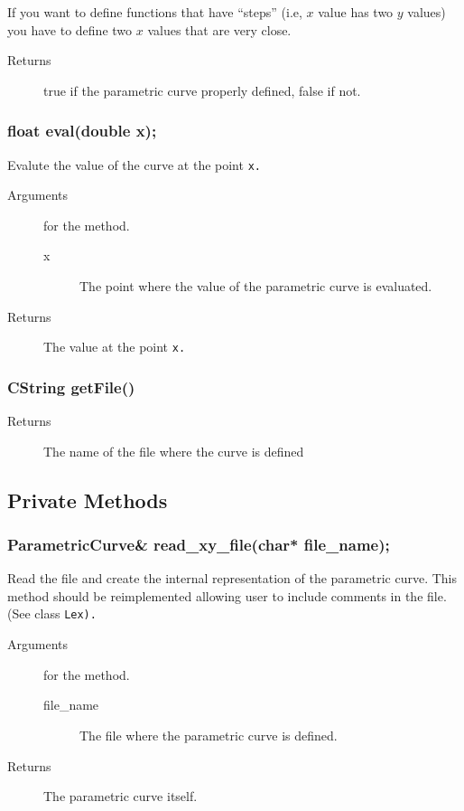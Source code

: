 If you want to define functions that have ``steps'' (i.e, $x$ value
has two $y$ values) you have to define two $x$ values that are 
very close. 
   
    \begin{description}
       \item [Returns] true if  the parametric curve properly defined,
                       false if not. 
    \end{description} 

\subsubsection{float eval(double x);}
Evalute the value of the curve at the point \tt x\rm.
\begin{description}  
    \item [Arguments] for the method.
      \begin{description}
        \item [x] The point where the value of the parametric curve 
                  is evaluated.
       \end{description}
    \item [Returns] The value at the point \tt x\rm.
\end{description} 

\subsubsection{CString getFile()}
\begin{description}
       \item [Returns] The name of the file where the curve is defined
    \end{description}


\subsection{Private Methods}
\subsubsection{ParametricCurve\& read\_xy\_file(char* file\_name);}
Read the file and create the internal representation of the parametric curve.
This method should be reimplemented allowing user to include
comments in the file. (See class \tt Lex\rm).
 \begin{description}
    \item [Arguments] for the method.
      \begin{description}
        \item [file\_name] The file where the parametric curve is defined.
       \end{description}
    \item [Returns] The parametric curve itself.
 \end{description} 

